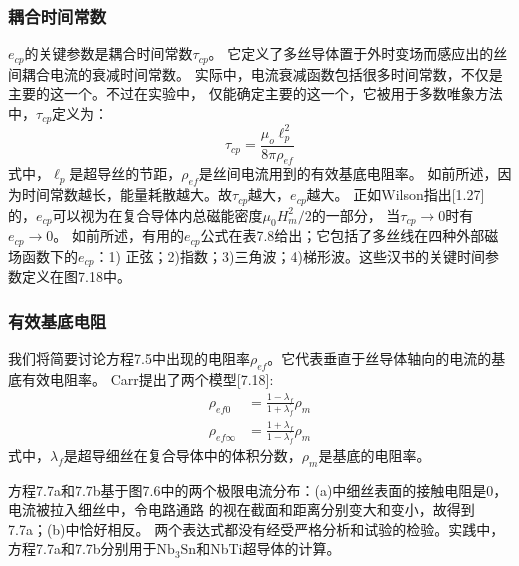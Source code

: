 \subsubsection*{耦合时间常数}
$e_{cp}$的关键参数是耦合时间常数$\tau_{cp}$。
它定义了多丝导体置于外时变场而感应出的丝间耦合电流的衰减时间常数。
实际中，电流衰减函数包括很多时间常数，不仅是主要的这一个。不过在实验中，
仅能确定主要的这一个，它被用于多数唯象方法中，$\tau_{cp}$定义为：
\begin{equation}%
\tau_{cp}=\frac{\mu_o\ell_{p}^{2}}{8\pi\rho_{ef}}
\end{equation}
式中，$\ell_p$是超导丝的节距，$\rho_{ef}$是丝间电流用到的有效基底电阻率。
如前所述，因为时间常数越长，能量耗散越大。故$\tau_{cp}$越大，$e_{cp}$越大。
正如Wilson指出[1.27]的，$e_{cp}$可以视为在复合导体内总磁能密度$\mu_0 H_m^2/2$的一部分，
当$\tau_{cp}\rightarrow 0$时有$e_{cp}\rightarrow 0$。
如前所述，有用的$e_{cp}$公式在表7.8给出；它包括了多丝线在四种外部磁场函数下的$e_{cp}$：1)
正弦；2)指数；3)三角波；4)梯形波。这些汉书的关键时间参数定义在图7.18中。

\subsubsection*{有效基底电阻}
我们将简要讨论方程7.5中出现的电阻率$\rho_{ef}$。它代表垂直于丝导体轴向的电流的基底有效电阻率。
Carr提出了两个模型[7.18]:
\begin{subequations}
	\begin{align}
	\rho_{ef0}&=\frac{1-\lambda_f}{1+\lambda_f}\rho_m\\
	\rho_{ef\infty}&=\frac{1+\lambda_f}{1-\lambda_f}\rho_m
	\end{align}
\end{subequations}
式中，$\lambda_f$是超导细丝在复合导体中的体积分数，$\rho_m$是基底的电阻率。

方程7.7a和7.7b基于图7.6中的两个极限电流分布：(a)中细丝表面的接触电阻是0，电流被拉入细丝中，令电路通路
的视在截面和距离分别变大和变小，故得到7.7a；(b)中恰好相反。
两个表达式都没有经受严格分析和试验的检验。实践中，方程7.7a和7.7b分别用于$\mathrm{Nb_3Sn}$和NbTi超导体的计算。

